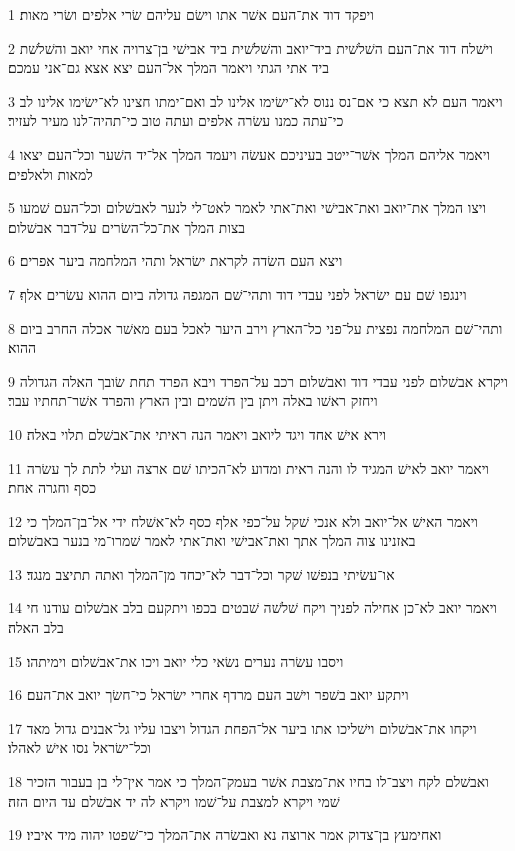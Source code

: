 \par 1 ויפקד דוד את־העם אשׁר אתו וישׂם עליהם שׂרי אלפים ושׂרי מאות׃
\par 2 וישׁלח דוד את־העם השׁלשׁית ביד־יואב והשׁלשׁית ביד אבישׁי בן־צרויה אחי יואב והשׁלשׁת ביד אתי הגתי ויאמר המלך אל־העם יצא אצא גם־אני עמכם׃
\par 3 ויאמר העם לא תצא כי אם־נס ננוס לא־ישׂימו אלינו לב ואם־ימתו חצינו לא־ישׂימו אלינו לב כי־עתה כמנו עשׂרה אלפים ועתה טוב כי־תהיה־לנו מעיר לעזיר׃
\par 4 ויאמר אליהם המלך אשׁר־ייטב בעיניכם אעשׂה ויעמד המלך אל־יד השׁער וכל־העם יצאו למאות ולאלפים׃
\par 5 ויצו המלך את־יואב ואת־אבישׁי ואת־אתי לאמר לאט־לי לנער לאבשׁלום וכל־העם שׁמעו בצות המלך את־כל־השׂרים על־דבר אבשׁלום׃
\par 6 ויצא העם השׂדה לקראת ישׂראל ותהי המלחמה ביער אפרים׃
\par 7 וינגפו שׁם עם ישׂראל לפני עבדי דוד ותהי־שׁם המגפה גדולה ביום ההוא עשׂרים אלף׃
\par 8 ותהי־שׁם המלחמה נפצית על־פני כל־הארץ וירב היער לאכל בעם מאשׁר אכלה החרב ביום ההוא׃
\par 9 ויקרא אבשׁלום לפני עבדי דוד ואבשׁלום רכב על־הפרד ויבא הפרד תחת שׂובך האלה הגדולה ויחזק ראשׁו באלה ויתן בין השׁמים ובין הארץ והפרד אשׁר־תחתיו עבר׃
\par 10 וירא אישׁ אחד ויגד ליואב ויאמר הנה ראיתי את־אבשׁלם תלוי באלה׃
\par 11 ויאמר יואב לאישׁ המגיד לו והנה ראית ומדוע לא־הכיתו שׁם ארצה ועלי לתת לך עשׂרה כסף וחגרה אחת׃
\par 12 ויאמר האישׁ אל־יואב ולא אנכי שׁקל על־כפי אלף כסף לא־אשׁלח ידי אל־בן־המלך כי באזנינו צוה המלך אתך ואת־אבישׁי ואת־אתי לאמר שׁמרו־מי בנער באבשׁלום׃
\par 13 או־עשׂיתי בנפשׁו שׁקר וכל־דבר לא־יכחד מן־המלך ואתה תתיצב מנגד׃
\par 14 ויאמר יואב לא־כן אחילה לפניך ויקח שׁלשׁה שׁבטים בכפו ויתקעם בלב אבשׁלום עודנו חי בלב האלה׃
\par 15 ויסבו עשׂרה נערים נשׂאי כלי יואב ויכו את־אבשׁלום וימיתהו׃
\par 16 ויתקע יואב בשׁפר וישׁב העם מרדף אחרי ישׂראל כי־חשׂך יואב את־העם׃
\par 17 ויקחו את־אבשׁלום וישׁליכו אתו ביער אל־הפחת הגדול ויצבו עליו גל־אבנים גדול מאד וכל־ישׂראל נסו אישׁ לאהלו׃
\par 18 ואבשׁלם לקח ויצב־לו בחיו את־מצבת אשׁר בעמק־המלך כי אמר אין־לי בן בעבור הזכיר שׁמי ויקרא למצבת על־שׁמו ויקרא לה יד אבשׁלם עד היום הזה׃
\par 19 ואחימעץ בן־צדוק אמר ארוצה נא ואבשׂרה את־המלך כי־שׁפטו יהוה מיד איביו׃
